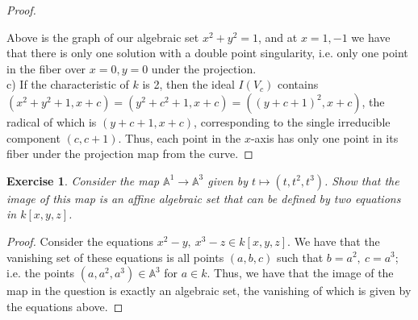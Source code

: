\documentclass{article}
\newcommand{\bb}[1]{\mathbb{#1}}
\newtheorem{exercise}{Exercise}
\begin{document}
\begin{proof}
\begin{center}

\end{center}

Above is the graph of our algebraic set $x^{2}+y^{2} = 1$, and at $x =1, -1$ we have that there is only one solution with a double point singularity, i.e. only one point in the fiber over $x = 0, y = 0$ under the projection. \\

c) If the characteristic of $k$ is 2, then the ideal $I(V_{c})$ contains $(x^{2}+y^{2} + 1, x + c) = (y^{2} + c^{2}+1, x+c) = ((y+c+1)^{2}, x + c)$, the radical of which is $(y+c+1, x + c)$, corresponding to the single irreducible component $(c, c + 1)$.  Thus, each point in the $x$-axis has only one point in its fiber under the projection map from the curve.
\end{proof}
\begin{exercise}
Consider the map $\bb{A}^{1} \to \bb{A}^{3}$ given by $t \mapsto (t,t^{2},t^{3})$. Show that the image of this map is an affine algebraic set that can be defined by two equations in $k[x,y,z]$.  
\end{exercise}
\begin{proof}
  Consider the equations $x^{2} - y, \ x^{3} - z \in k[x,y,z]$. We have that the vanishing set of these equations is all points $(a,b,c)$ such that $b = a^{2}, \  c = a^{3}$; i.e. the points $(a,a^{2},a^{3}) \in \bb{A}^{3}$ for $a \in k$. Thus, we have that the image of the map in the question is exactly an algebraic set, the vanishing of which is given by the equations above. 
\end{proof}
\end{document}
